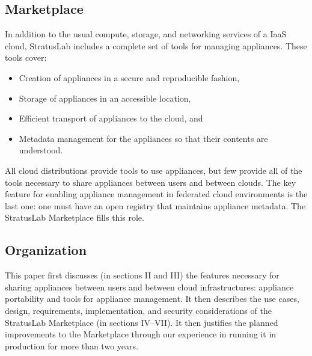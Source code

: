 \subsection{Marketplace}

In addition to the usual compute, storage, and networking services of
a IaaS cloud, StratusLab includes a complete set of tools for managing
appliances.  These tools cover:
\begin{itemize}
\item Creation of appliances in a secure and reproducible fashion,
\item Storage of appliances in an accessible location,
\item Efficient transport of appliances to the cloud,
  and
\item Metadata management for the appliances so that their contents
  are understood.
\end{itemize}
All cloud distributions provide tools to use appliances, but few
provide all of the tools necessary to share appliances between users
and between clouds.  The key feature for enabling appliance management
in federated cloud environments is the last one: one must have an open
registry that maintains appliance metadata.  The StratusLab
Marketplace fills this role.

\subsection{Organization}

This paper first discusses (in sections II and III) the features
necessary for sharing appliances between users and between cloud
infrastructures: appliance portability and tools for appliance
management.  It then describes the use cases, design, requirements,
implementation, and security considerations of the StratusLab
Marketplace (in sections IV--VII).  It then justifies the planned
improvements to the Marketplace through our experience in running it
in production for more than two years.
